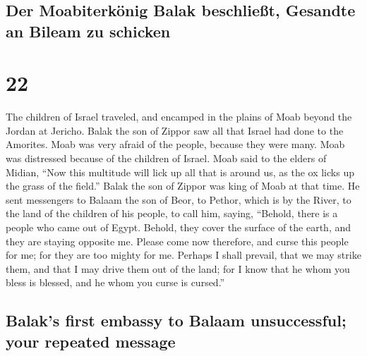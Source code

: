 \hypertarget{der-moabiterkuxf6nig-balak-beschlieuxdft-gesandte-an-bileam-zu-schicken}{%
\subsection{Der Moabiterkönig Balak beschließt, Gesandte an Bileam zu
schicken}\label{der-moabiterkuxf6nig-balak-beschlieuxdft-gesandte-an-bileam-zu-schicken}}

\hypertarget{section-21}{%
\section{22}\label{section-21}}

 The children of Israel traveled, and encamped in the
plains of Moab beyond the Jordan at Jericho.  Balak the
son of Zippor saw all that Israel had done to the Amorites.
 Moab was very afraid of the people, because they were
many. Moab was distressed because of the children of Israel.
 Moab said to the elders of Midian, ``Now this multitude
will lick up all that is around us, as the ox licks up the grass of the
field.'' Balak the son of Zippor was king of Moab at that time.
 He sent messengers to Balaam the son of Beor, to Pethor,
which is by the River, to the land of the children of his people, to
call him, saying, ``Behold, there is a people who came out of Egypt.
Behold, they cover the surface of the earth, and they are staying
opposite me.  Please come now therefore, and curse this
people for me; for they are too mighty for me. Perhaps I shall prevail,
that we may strike them, and that I may drive them out of the land; for
I know that he whom you bless is blessed, and he whom you curse is
cursed.''

\hypertarget{balaks-first-embassy-to-balaam-unsuccessful-your-repeated-message}{%
\subsection{Balak's first embassy to Balaam unsuccessful; your repeated
message}\label{balaks-first-embassy-to-balaam-unsuccessful-your-repeated-message}}

